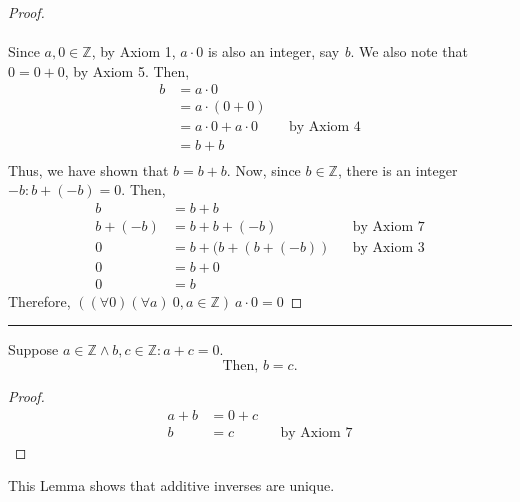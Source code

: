 \documentclass{article}
\def \proofDistance {5pt}
\newcommand{\proofseparator}{\par\noindent\rule{\textwidth}{0.4pt}}
\newcommand{\Z}{\ensuremath{\mathbb{Z}}}
\begin{document}
            \begin{proof}
                \mbox{}\\[-\baselineskip] \\
                Since $a,0\in \Z$, by Axiom 1, $a\cdot 0$ is also an integer, say \textit{b}. We also note that $0 = {0 + 0}$, by Axiom 5. Then, 
                \begin{align*}
                    b &= a\cdot 0 \\
                    &= a\cdot (0 + 0) \\
                    &= a\cdot 0 + a\cdot 0 && \text{by Axiom 4} \\
                    &= b + b \\
                \end{align*}
                Thus, we have shown that $b = {b + b}$. Now, since $b\in \Z$, there is an integer $-b\colon b + (-b) = 0$. Then, 
                \begin{align*}
                    b &= b + b \\
                    b + (-b) &= b + b + (-b) && \text{by Axiom 7} \\
                    0 &= b + (b +(b + (-b)) && \text{by Axiom 3} \\
                    0 &= b + 0 \\
                    0 &= b
                \end{align*}
                Therefore, $((\forall 0)(\forall a) \ 0, a \in \Z) \ a\cdot 0 = 0$
            \end{proof}
        
            \proofseparator
    

\newpage

        
            \begin{lemma}
                Suppose $a\in \Z \land b, c \in \Z \colon {a + c = 0}$. $$\text{Then, } b = c.$$
            \end{lemma}
        
            \vspace{\proofDistance}
        
            \begin{proof}
                \begin{align*}
                    a + b &= 0 + c \\
                    b &= c && \text{by Axiom 7}
                \end{align*}
            \end{proof}
            This Lemma shows that additive inverses are unique.
        
\end{document}
